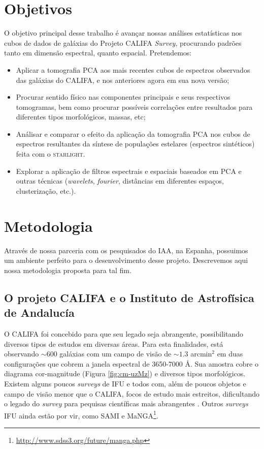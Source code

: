 \documentclass[a4paper,12pt]{article}
\def\starlight{\textsc{starlight}\xspace}      %
\begin{document}
\section{Objetivos}
O objetivo principal desse trabalho é avançar nossas análises estatísticas nos cubos de dados de galáxias do Projeto CALIFA {\em Survey}, procurando
padrões tanto em dimensão espectral, quanto espacial. Pretendemos:
\begin{itemize}
  \item Aplicar a tomografia PCA aos mais recentes cubos de espectros observados das galáxias do CALIFA, e nos anteriores agora em sua nova versão;
  \item Procurar sentido físico nas componentes principais e seus respectivos tomogramas, bem como procurar possíveis correlações entre resultados
  para diferentes tipos morfológicos, massas, etc;
  \item Análisar e comparar o efeito da aplicação da tomografia PCA nos cubos de espectros resultantes da síntese de populações estelares (espectros
  sintéticos) feita com o \starlight.
  \item Explorar a aplicação de filtros espectrais e espaciais baseados em PCA e outras técnicas ({\em wavelets}, {\em
  fourier}, distâncias em diferentes espaços, clusterização, etc.).
\end{itemize}

\section{Metodologia}
Através de nossa parceria com os pesquisados do IAA, na Espanha, possuimos um ambiente perfeito para o desenvolvimento desse projeto. Descrevemos aqui
nossa metodologia proposta para tal fim.

\subsection{O projeto CALIFA e o Instituto de Astrofísica de Andalucía}

O CALIFA foi concebido para que seu legado seja abrangente, possibilitando diversos tipos de estudos em diversas áreas. Para esta finalidades, está
observando $\sim 600$ galáxias com um campo de visão de $\sim1.3$ arcmin$^2$ em duas configurações que cobrem a janela espectral de 3650-7000 \AA. Sua
amostra cobre o diagrama cor-magnitude (Figura \ref{fig:cm-uzMz}) e diversos tipos morfológicos. Existem alguns poucos {\em surveys} de IFU e todos
com, além de poucos objetos e campo de visão menor que o CALIFA, focos de estudo mais estreitos, dificultando o legado do {\em survey} para pequisas
científicas mais abrangentes \citep[SAURON;][região central de 72 galáxias com $z < 0.01$.]{de-Zeeuw2002} \citep[PINGS;][algumas galáxias muito
próximas ($\sim 10$ Mpc) e o estudo atual de 70 (U)LIRGs com $z <0.26$]{RosalesOrtega2010} \citep[VENGA;][$30$ galáxias espirais]{Blanc2010}
\citep[ATLAS\textsuperscript{3D};][260 galáxias {\em early-type} próximas]{Cappellari2011}. Outros {\em surveys} IFU ainda estão por vir, como SAMI
\citep{Croom2012} e MaNGA\footnote{\url{http://www.sdss3.org/future/manga.php}}.
\end{document}
